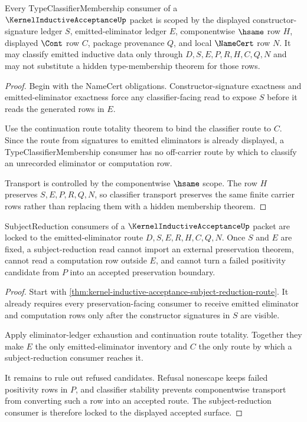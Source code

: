 \begin{theorem}
\label{thm:kernel-inductive-acceptance-typeclassifier-scope-route}
Every TypeClassifierMembership consumer of a $\KernelInductiveAcceptanceUp$ packet is scoped by the displayed constructor-signature ledger $S$, emitted-eliminator ledger $E$, componentwise $\hsame$ row $H$, displayed $\Cont$ row $C$, package provenance $Q$, and local $\NameCert$ row $N$. It may classify emitted inductive data only through $D,S,E,P,R,H,C,Q,N$ and may not substitute a hidden type-membership theorem for those rows.
\end{theorem}
\begin{proof}
Begin with the NameCert obligations. Constructor-signature exactness and emitted-eliminator exactness force any classifier-facing read to expose $S$ before it reads the generated rows in $E$.

Use the continuation route totality theorem to bind the classifier route to $C$. Since the route from signatures to emitted eliminators is already displayed, a TypeClassifierMembership consumer has no off-carrier route by which to classify an unrecorded eliminator or computation row.

Transport is controlled by the componentwise $\hsame$ scope. The row $H$ preserves $S,E,P,R,Q,N$, so classifier transport preserves the same finite carrier rows rather than replacing them with a hidden membership theorem.
\end{proof}

\begin{theorem}
\label{thm:kernel-inductive-acceptance-subject-reduction-scope-lock}
SubjectReduction consumers of a $\KernelInductiveAcceptanceUp$ packet are locked to the emitted-eliminator route $D,S,E,R,H,C,Q,N$. Once $S$ and $E$ are fixed, a subject-reduction read cannot import an external preservation theorem, cannot read a computation row outside $E$, and cannot turn a failed positivity candidate from $P$ into an accepted preservation boundary.
\end{theorem}
\begin{proof}
Start with \autoref{thm:kernel-inductive-acceptance-subject-reduction-route}. It already requires every preservation-facing consumer to receive emitted eliminator and computation rows only after the constructor signatures in $S$ are visible.

Apply eliminator-ledger exhaustion and continuation route totality. Together they make $E$ the only emitted-eliminator inventory and $C$ the only route by which a subject-reduction consumer reaches it.

It remains to rule out refused candidates. Refusal nonescape keeps failed positivity rows in $P$, and classifier stability prevents componentwise transport from converting such a row into an accepted route. The subject-reduction consumer is therefore locked to the displayed accepted surface.
\end{proof}


